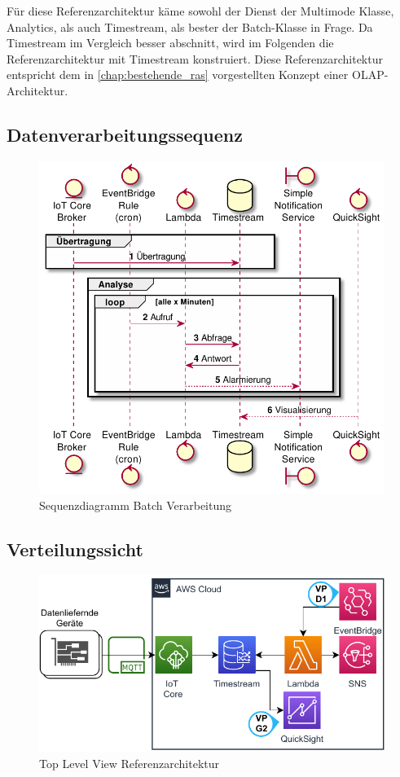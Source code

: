 Für diese Referenzarchitektur käme sowohl der Dienst der Multimode Klasse, \AWSIOT{} Analytics, als auch Timestream, als bester der Batch-Klasse in Frage. Da Timestream im Vergleich besser abschnitt, wird im Folgenden die Referenzarchitektur mit Timestream konstruiert.
Diese Referenzarchitektur entspricht dem in \autoref{chap:bestehende_ras} vorgestellten Konzept einer \ac{OLAP}-Architektur.

\subsection{Datenverarbeitungssequenz}

\begin{figure}[H]
\centering
\includegraphics[width=\textwidth]{graphics/batch-ra.pdf}
\caption{Sequenzdiagramm Batch Verarbeitung}
\label{abb:SequenceBatchRA}
\end{figure}

\subsection{Verteilungssicht}
\begin{figure}[H]
\centering
\includegraphics[width=\textwidth]{graphics/DB-RA-Overview.pdf}
\caption{Top Level View Referenzarchitektur}
\label{abb:TopLevelDBRA}
\end{figure}


